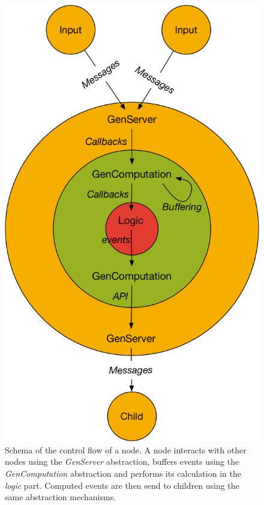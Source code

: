 \begin{figure}
  \center
  \includegraphics[width=\textwidth,height=0.9\textheight,keepaspectratio]{content/figs/node_architecture}
  \caption[Control flow of a node]{Schema of the control flow of a node. A node interacts with other nodes using the \emph{GenServer} abstraction, buffers events using the \emph{GenComputation} abstraction and performs its calculation in the \emph{logic} part. Computed events are then send to children using the same abstraction mechanisms.}
\label{fig:chap6:sec_node_impl:node_control_flow}
\end{figure}

